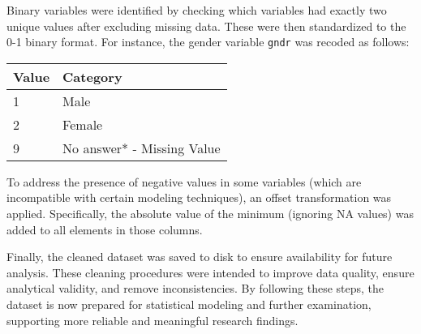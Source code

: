 	Binary variables were identified by checking which variables had exactly two unique values after excluding missing data. These were then standardized to the 0-1 binary format. For instance, the gender variable \texttt{gndr} was recoded as follows:
	
	\begin{longtable}{ll}
		\toprule
		\textbf{Value} & \textbf{Category} \\
		\midrule
		1 & Male \\
		2 & Female \\
		9 & No answer* - Missing Value \\
		\bottomrule
	\end{longtable}
	
	To address the presence of negative values in some variables (which are incompatible with certain modeling techniques), an offset transformation was applied. Specifically, the absolute value of the minimum (ignoring NA values) was added to all elements in those columns. 
	
	Finally, the cleaned dataset was saved to disk to ensure availability for future analysis. These cleaning procedures were intended to improve data quality, ensure analytical validity, and remove inconsistencies. By following these steps, the dataset is now prepared for statistical modeling and further examination, supporting more reliable and meaningful research findings.
	
